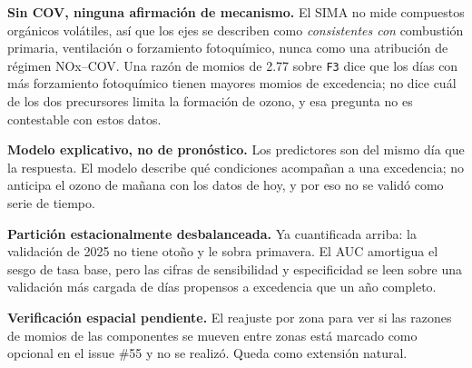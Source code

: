 \documentclass[
  spanish,
  letterpaper,
  DIV=11,
  numbers=noendperiod]{scrartcl}
\begin{document}
\textbf{Sin COV, ninguna afirmación de mecanismo.} El SIMA no mide
compuestos orgánicos volátiles, así que los ejes se describen como
\emph{consistentes con} combustión primaria, ventilación o forzamiento
fotoquímico, nunca como una atribución de régimen NOx--COV. Una razón de
momios de 2.77 sobre \texttt{F3} dice que los días con más forzamiento
fotoquímico tienen mayores momios de excedencia; no dice cuál de los dos
precursores limita la formación de ozono, y esa pregunta no es
contestable con estos datos.

\textbf{Modelo explicativo, no de pronóstico.} Los predictores son del
mismo día que la respuesta. El modelo describe qué condiciones acompañan
a una excedencia; no anticipa el ozono de mañana con los datos de hoy, y
por eso no se validó como serie de tiempo.

\textbf{Partición estacionalmente desbalanceada.} Ya cuantificada
arriba: la validación de 2025 no tiene otoño y le sobra primavera. El
AUC amortigua el sesgo de tasa base, pero las cifras de sensibilidad y
especificidad se leen sobre una validación más cargada de días propensos
a excedencia que un año completo.

\textbf{Verificación espacial pendiente.} El reajuste por zona para ver
si las razones de momios de las componentes se mueven entre zonas está
marcado como opcional en el issue \#55 y no se realizó. Queda como
extensión natural.
\end{document}
